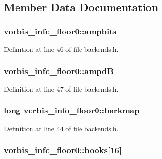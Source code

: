 \subsection{Member Data Documentation}
\subsubsection[{\texorpdfstring{ampbits}{ampbits}}]{ vorbis\+\_\+info\+\_\+floor0\+::ampbits}\hypertarget{structvorbis__info__floor0_a01f2bbcabd4a1d82a3466598ded6ab67}{}\label{structvorbis__info__floor0_a01f2bbcabd4a1d82a3466598ded6ab67}


Definition at line 46 of file backends.\+h.

\subsubsection[{\texorpdfstring{ampdB}{ampdB}}]{ vorbis\+\_\+info\+\_\+floor0\+::ampdB}\hypertarget{structvorbis__info__floor0_a1896fee756462b4168a7c89b0514ef2e}{}\label{structvorbis__info__floor0_a1896fee756462b4168a7c89b0514ef2e}


Definition at line 47 of file backends.\+h.

\subsubsection[{\texorpdfstring{barkmap}{barkmap}}]{\setlength{\rightskip}{0pt plus 5cm}long vorbis\+\_\+info\+\_\+floor0\+::barkmap}\hypertarget{structvorbis__info__floor0_aa0ee524de27bf41fadb08d075ac65265}{}\label{structvorbis__info__floor0_aa0ee524de27bf41fadb08d075ac65265}


Definition at line 44 of file backends.\+h.

\subsubsection[{\texorpdfstring{books}{books}}]{ vorbis\+\_\+info\+\_\+floor0\+::books\mbox{[}16\mbox{]}}\hypertarget{structvorbis__info__floor0_a0f726482143e32b7bfcfea3851e42247}{}\label{structvorbis__info__floor0_a0f726482143e32b7bfcfea3851e42247}


